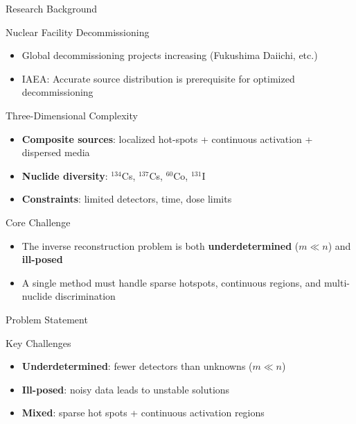 \documentclass{sysupptthesis}
\begin{document}
\begin{frame}{Research Background}
    \begin{block}{Nuclear Facility Decommissioning}
        \begin{itemize}\footnotesize
            \item Global decommissioning projects increasing (Fukushima Daiichi, etc.)
            \item IAEA: Accurate source distribution is prerequisite for optimized decommissioning
        \end{itemize}
    \end{block}

    \begin{block}{Three-Dimensional Complexity}
        \begin{itemize}\footnotesize
            \item \textbf{Composite sources}: localized hot-spots + continuous activation + dispersed media
            \item \textbf{Nuclide diversity}: $^{134}$Cs, $^{137}$Cs, $^{60}$Co, $^{131}$I
            \item \textbf{Constraints}: limited detectors, time, dose limits
        \end{itemize}
    \end{block}

    \begin{block}{Core Challenge}
        \begin{itemize}\footnotesize
            \item The inverse reconstruction problem is both \textbf{underdetermined} ($m \ll n$) and \textbf{ill-posed}
            \item A single method must handle sparse hotspots, continuous regions, and multi-nuclide discrimination
        \end{itemize}
    \end{block}
\end{frame}

\begin{frame}{Problem Statement}

    \begin{block}{Key Challenges}
        \begin{itemize}\footnotesize
            \item \textbf{Underdetermined}: fewer detectors than unknowns ($m \ll n$)
            \item \textbf{Ill-posed}: noisy data leads to unstable solutions
            \item \textbf{Mixed}: sparse hot spots + continuous activation regions
        \end{itemize}
    \end{block}
\end{frame}
\end{document}
